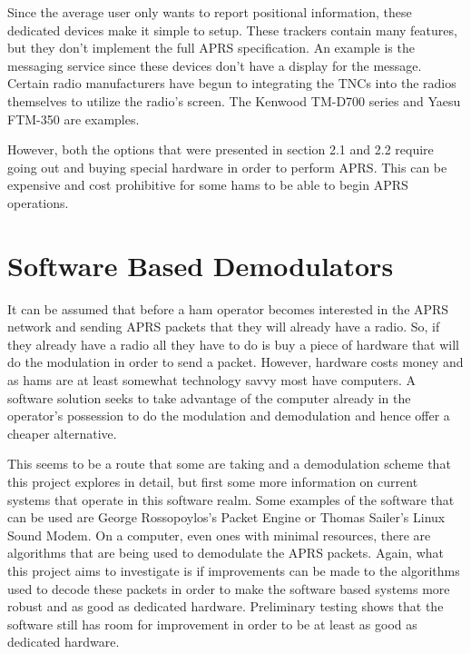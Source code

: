 Since the average user only wants to report positional information, these dedicated devices make it simple to setup. These trackers contain many features, but they don’t implement the full APRS specification. An example is the messaging service since these devices don’t have a display for the message. Certain radio manufacturers have begun to integrating the TNCs into the radios themselves to utilize the radio’s screen. The Kenwood TM-D700 series and Yaesu FTM-350 are examples.

However, both the options that were presented in section 2.1 and 2.2 require going out and buying special hardware in order to perform APRS. This can be expensive and cost prohibitive for some hams to be able to begin APRS operations.

\section{Software Based Demodulators}

It can be assumed that before a ham operator becomes interested in the APRS network and sending APRS packets that they will already have a radio. So, if they already have a radio all they have to do is buy a piece of hardware that will do the modulation in order to send a packet. However, hardware costs money and as hams are at least somewhat technology savvy most have computers. A software solution seeks to take advantage of the computer already in the operator’s possession to do the modulation and demodulation and hence offer a cheaper alternative.

This seems to be a route that some are taking and a demodulation scheme that this project explores in detail, but first some more information on current systems that operate in this software realm. Some examples of the software that can be used are George Rossopoylos’s Packet Engine or Thomas Sailer’s Linux Sound Modem. On a computer, even ones with minimal resources, there are algorithms that are being used to demodulate the APRS packets. Again, what this project aims to investigate is if improvements can be made to the algorithms used to decode these packets in order to make the software based systems more robust and as good as dedicated hardware. Preliminary testing shows that the software still has room for improvement in order to be at least as good as dedicated hardware.
